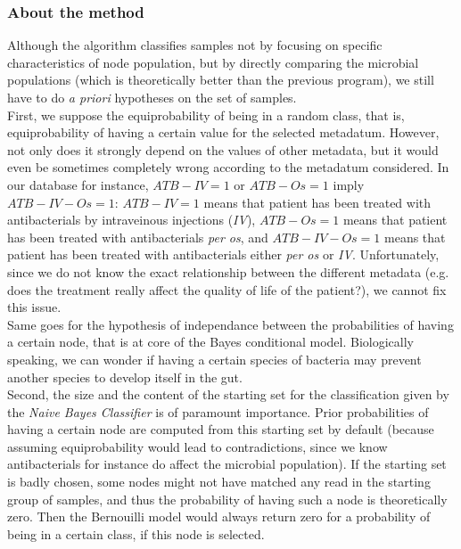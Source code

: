 \documentclass{report}
\begin{document}
\subsubsection{About the method}

Although the algorithm classifies samples not by focusing on specific characteristics of node population, but by directly comparing the microbial populations (which is theoretically better than the previous program), we still have to do \emph{a priori} hypotheses on the set of samples.\\

First, we suppose the equiprobability of being in a random class, that is, equiprobability of having a certain value for the selected metadatum. However, not only does it strongly depend on the values of other metadata, but it would even be sometimes completely wrong according to the metadatum considered. In our database for instance, $ATB-IV = 1$ or $ATB-Os = 1$ imply $ATB-IV-Os = 1$: $ATB-IV = 1$ means that patient has been treated with antibacterials by intraveinous injections (\emph{IV}), $ATB-Os = 1$ means that patient has been treated with antibacterials \emph{per os}, and $ATB-IV-Os = 1$ means that patient has been treated with antibacterials either \emph{per os} or \emph{IV}. Unfortunately, since we do not know the exact relationship between the different metadata (e.g. does the treatment really affect the quality of life of the patient?), we cannot fix this issue.\\

Same goes for the hypothesis of independance between the probabilities of having a certain node, that is at core of the Bayes conditional model. Biologically speaking, we can wonder if having a certain species of bacteria may prevent another species to develop itself in the gut.\\

Second, the size and the content of the starting set for the classification given by the \emph{Naive Bayes Classifier} is of paramount importance. Prior probabilities of having a certain node are computed from this starting set by default (because assuming equiprobability would lead to contradictions, since we know antibacterials for instance do affect the microbial population). If the starting set is badly chosen, some nodes might not have matched any read in the starting group of samples, and thus the probability of having such a node is theoretically zero. Then the Bernouilli model would always return zero for a probability of being in a certain class, if this node is selected.\\
\end{document}
